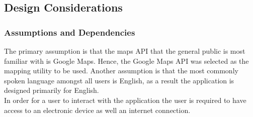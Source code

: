 \documentclass[10pt,twocolumn]{witseiepaper}
\begin{document}
%		
	
	\subsection{Design Considerations}
	
		\subsubsection{Assumptions and Dependencies}
		
			The primary assumption is that the maps API that the general public is most familiar with is Google Maps. Hence, the Google Maps API was selected as the mapping utility to be used. Another assumption is that the most commonly spoken language amongst all users is English, as a result the application is designed primarily for English. \\
			
			In order for a user to interact with the application the user is required to have access to an electronic device as well an internet connection. 
			
\end{document}
